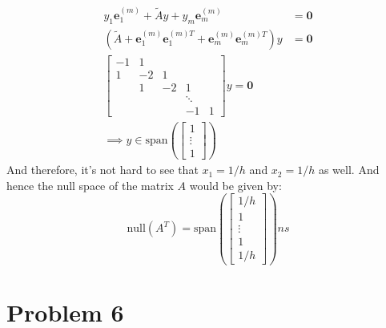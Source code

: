 \documentclass[]{article}
\begin{document}
        \begin{align*}\tag{5.3}\label{eqn:5.3}
            y_1 \mathbf{e}_1^{(m)} + \tilde{A}y + y_m \mathbf{e}_m^{(m)} 
            &= \mathbf{0}
            \\
            (\tilde{A} + \mathbf{e}^{(m)}_1\mathbf{e}^{(m)T}_1 + \mathbf{e}_m^{(m)}\mathbf{e}_m^{(m)T}) y &= \mathbf{0}
            \\
            \begin{bmatrix}
                -1 & 1 & & \\
                1 & -2 & 1 & \\
                & 1& -2& 1 \\
                & & & \ddots & \\
                & & & -1&1 
            \end{bmatrix} y = \mathbf{0}
            \\
            \implies
            y \in \text{span}\left(
                \begin{bmatrix}
                    1 \\ \vdots \\ 1
                \end{bmatrix}
            \right)
        \end{align*}
        And therefore, it's not hard to see that $x_1 = 1/h$ and $x_2 = 1/h$ as well. And hence the null space of the matrix $A$ would be given by: 
        $$
            \text{null}(A^T) = \text{span}\left(
                \begin{bmatrix}
                    1/h \\ 1 \\ \vdots \\ 1 \\ 1/h
                \end{bmatrix}
            \right)ns
        $$
\section*{Problem 6}
\end{document}

